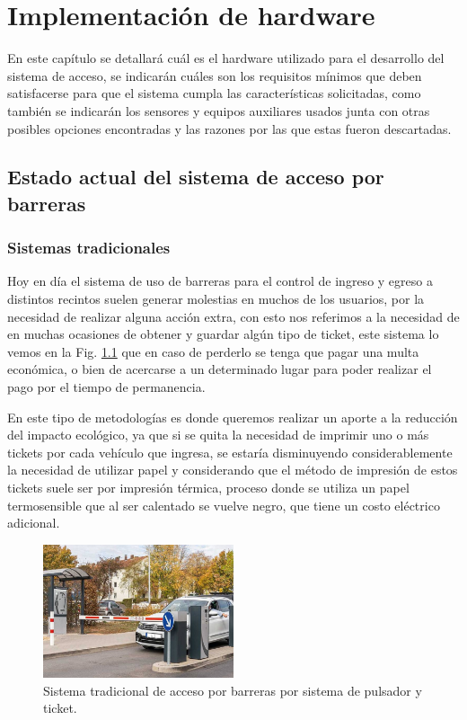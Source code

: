 \chapter{Implementación de hardware}
En este capítulo se detallará cuál es el hardware utilizado para el desarrollo del sistema de acceso, se indicarán cuáles
son los requisitos mínimos que deben satisfacerse para que el sistema cumpla las características solicitadas, como
también se indicarán los sensores y equipos auxiliares usados junta con otras posibles opciones encontradas y las
razones por las que estas fueron descartadas.


\section{Estado actual del sistema de acceso por barreras}

\subsection{Sistemas tradicionales}

Hoy en día el sistema de uso de barreras para el control de ingreso y egreso a distintos recintos suelen generar molestias
en muchos de los usuarios, por la necesidad de realizar alguna acción extra, con esto nos referimos a la necesidad de
en muchas ocasiones de obtener y guardar algún tipo de ticket, este sistema lo vemos en la Fig. \ref{fig:sistema-tradicional}
que en caso de perderlo se tenga que pagar una multa económica, o bien de acercarse a un determinado lugar para poder realizar el pago por el tiempo de permanencia.

En este tipo de metodologías es donde queremos realizar un aporte a la reducción del impacto ecológico, ya que si se quita
la necesidad de imprimir uno o más tickets por cada vehículo que ingresa, se estaría disminuyendo considerablemente la
necesidad de utilizar papel y considerando que el método de impresión de estos tickets suele ser por impresión térmica,
proceso donde se utiliza un papel termosensible que al ser calentado se vuelve negro, que tiene un costo 
eléctrico adicional.
\begin{figure}
    \centering
    \includegraphics[width=0.5\textwidth]{imgs/sistema-control-acceso-barreras.jpg}
    \caption{Sistema tradicional de acceso por barreras por sistema de pulsador y ticket.}
    \label{fig:sistema-tradicional}
\end{figure}

